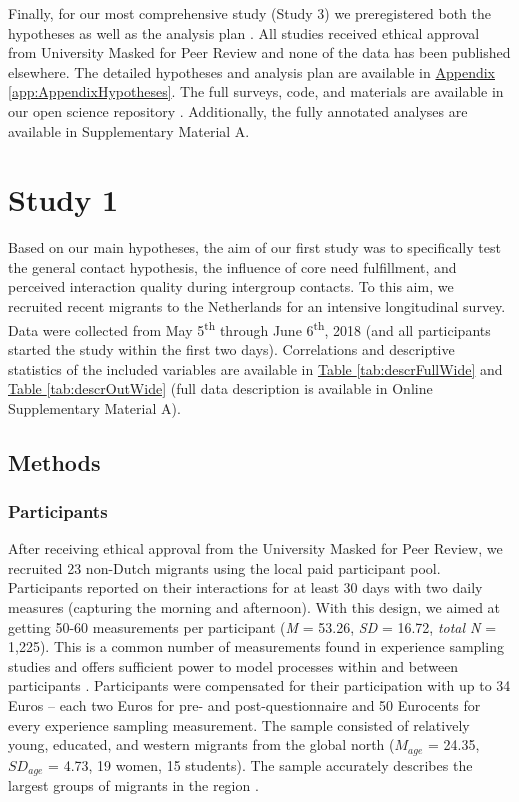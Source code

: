 \documentclass[man, 12pt, a4paper, mask]{apa7}
\theoremstyle{break}
\theoremstyle{plain}
\newcommand{\tblref}[2][]{\hyperref[#2]{Table \ref*{#2}#1}}
\newcommand{\appref}[2][]{\hyperref[#2]{Appendix \ref*{#2}#1}}
\begin{document}
Finally, for our most comprehensive study (Study 3) we preregistered both the hypotheses as well as the analysis plan \citep[available at][]{KreienkampMasked2021f}. All studies received ethical approval from University Masked for Peer Review and none of the data has been published elsewhere. The detailed hypotheses and analysis plan are available in \appref{app:AppendixHypotheses}. The full surveys, code, and materials are available in our open science repository \citep[including a complete codebook;][]{KreienkampMasked2022a}. Additionally, the fully annotated analyses are available in Supplementary Material A.

\section{Study 1}

Based on our main hypotheses, the aim of our first study was to
specifically test the general contact hypothesis, the influence of core
need fulfillment, and perceived interaction quality during intergroup
contacts. To this aim, we recruited recent migrants to the Netherlands
for an intensive longitudinal survey. Data were collected from May
5\textsuperscript{th} through June 6\textsuperscript{th}, 2018 (and all
participants started the study within the first two days). Correlations
and descriptive statistics of the included variables are available in
\tblref{tab:descrFullWide} and \tblref{tab:descrOutWide} (full data
description is available in Online Supplementary Material A).

\subsection{Methods}

\subsubsection{Participants}

After receiving ethical approval from the University Masked for Peer
Review, we recruited 23 non-Dutch migrants using the local paid
participant pool. Participants reported on their interactions for at
least 30 days with two daily measures (capturing the morning and
afternoon). With this design, we aimed at getting 50-60 measurements per
participant (\textit{M} = 53.26, \textit{SD} = 16.72, \textit{total N} =
1,225). This is a common number of measurements found in experience
sampling studies and offers sufficient power to model processes within
and between participants \citep[e.g.,][]{AanhetRot2012}. Participants
were compensated for their participation with up to 34 Euros -- each two
Euros for pre- and post-questionnaire and 50 Eurocents for every
experience sampling measurement. The sample consisted of relatively
young, educated, and western migrants from the global north (\(M_{age}\)
= 24.35, \(SD_{age}\) = 4.73, 19 women, 15 students). The sample
accurately describes the largest groups of migrants in the region
\citep[][]{GemeenteGroningen2015}.
\end{document}
